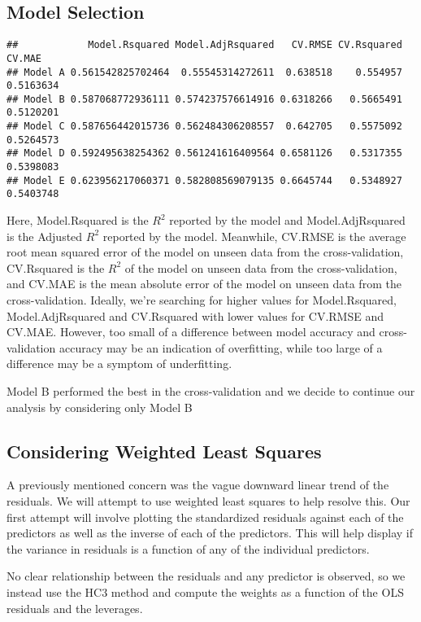 \documentclass[]{article}
\begin{document}
\subsection{Model Selection}\label{model-selection}

\begin{verbatim}
##            Model.Rsquared Model.AdjRsquared   CV.RMSE CV.Rsquared    CV.MAE
## Model A 0.561542825702464  0.55545314272611  0.638518    0.554957 0.5163634
## Model B 0.587068772936111 0.574237576614916 0.6318266   0.5665491 0.5120201
## Model C 0.587656442015736 0.562484306208557  0.642705   0.5575092 0.5264573
## Model D 0.592495638254362 0.561241616409564 0.6581126   0.5317355 0.5398083
## Model E 0.623956217060371 0.582808569079135 0.6645744   0.5348927 0.5403748
\end{verbatim}

Here, Model.Rsquared is the \(R^2\) reported by the model and
Model.AdjRsquared is the Adjusted \(R^2\) reported by the model.
Meanwhile, CV.RMSE is the average root mean squared error of the model
on unseen data from the cross-validation, CV.Rsquared is the \(R^2\) of
the model on unseen data from the cross-validation, and CV.MAE is the
mean absolute error of the model on unseen data from the
cross-validation. Ideally, we're searching for higher values for
Model.Rsquared, Model.AdjRsquared and CV.Rsquared with lower values for
CV.RMSE and CV.MAE. However, too small of a difference between model
accuracy and cross-validation accuracy may be an indication of
overfitting, while too large of a difference may be a symptom of
underfitting.

Model B performed the best in the cross-validation and we decide to
continue our analysis by considering only Model B

\subsection{Considering Weighted Least
Squares}\label{considering-weighted-least-squares}

A previously mentioned concern was the vague downward linear trend of
the residuals. We will attempt to use weighted least squares to help
resolve this. Our first attempt will involve plotting the standardized
residuals against each of the predictors as well as the inverse of each
of the predictors. This will help display if the variance in residuals
is a function of any of the individual predictors.

No clear relationship between the residuals and any predictor is
observed, so we instead use the HC3 method and compute the weights as a
function of the OLS residuals and the leverages.
\end{document}

